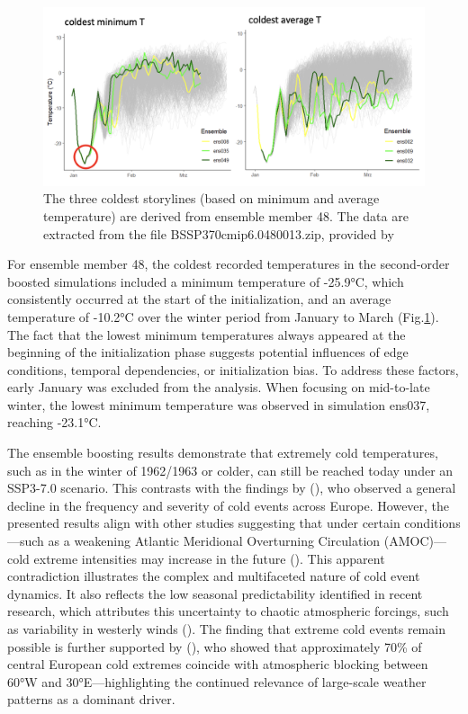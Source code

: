 \documentclass[
]{krantz}
\begin{document}
\begin{figure}

{\centering \includegraphics[width=0.9\linewidth]{work/03-coldex/figures/boosting results48} 

}

\caption{The three coldest storylines (based on minimum and average temperature) are derived from ensemble member 48. The data are extracted from the file BSSP370cmip6.0480013.zip, provided by \citet{sippel2024}}\label{fig:boosting-result48}
\end{figure}

For ensemble member 48, the coldest recorded temperatures in the second-order boosted simulations included a minimum temperature of -25.9°C, which consistently occurred at the start of the initialization, and an average temperature of -10.2°C over the winter period from January to March (Fig.\ref{fig:boosting-result48}). The fact that the lowest minimum temperatures always appeared at the beginning of the initialization phase suggests potential influences of edge conditions, temporal dependencies, or initialization bias. To address these factors, early January was excluded from the analysis. When focusing on mid-to-late winter, the lowest minimum temperature was observed in simulation ens037, reaching -23.1°C.

The ensemble boosting results demonstrate that extremely cold temperatures, such as in the winter of 1962/1963 or colder, can still be reached today under an SSP3-7.0 scenario. This contrasts with the findings by (\citet{quesada2023}), who observed a general decline in the frequency and severity of cold events across Europe. However, the presented results align with other studies suggesting that under certain conditions---such as a weakening Atlantic Meridional Overturning Circulation (AMOC)---cold extreme intensities may increase in the future (\citet{meccia2023}). This apparent contradiction illustrates the complex and multifaceted nature of cold event dynamics. It also reflects the low seasonal predictability identified in recent research, which attributes this uncertainty to chaotic atmospheric forcings, such as variability in westerly winds (\citet{kautz2021}). The finding that extreme cold events remain possible is further supported by (\citet{brunner2018}), who showed that approximately 70\% of central European cold extremes coincide with atmospheric blocking between 60°W and 30°E---highlighting the continued relevance of large-scale weather patterns as a dominant driver.
\end{document}
